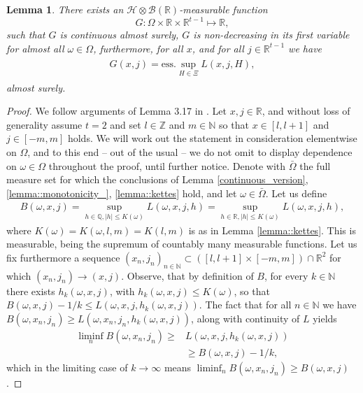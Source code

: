 \documentclass[a4paper]{article}
\newtheorem{lemma}[theorem]{Lemma}
\begin{document}
\begin{lemma}\label{lemma::pointwise_essup}
There exists an $\mathcal{H}\otimes\mathcal{B}(\mathbb{R})$-measurable function 
$$G :\Omega\times\mathbb{R}\times \mathbb{R}^{t-1} \mapsto \mathbb{R},$$ such that $G$ is 
continuous almost surely, $G$ is non-decreasing in its first variable for almost all 
$\omega\in\Omega$, furthermore, for all $x$, and for all $j \in \mathbb{R}^{t-1}$ we have 
\begin{align}\label{majus5}
\begin{split}
G(x, j) =  \mathrm{ess.}\sup_{H \in \Xi} L(x, j, H),
\end{split}
\end{align}
almost surely.
\end{lemma}

\begin{proof} We follow arguments of Lemma 3.17 in \cite{laurence}.
Let $x,j \in \mathbb{R}$, and without loss of generality assume $t = 2$ and set $l\in\mathbb{Z}$ 
and $m \in \mathbb{N}$ so that $x \in [l,l+1]$ and $j \in [-m,m]$ holds. We will 
work out the statement in consideration elementwise on $\Omega$, and to this end -- out of the usual -- we 
do not omit to display dependence on $\omega\in\Omega$ throughout the proof, until further notice. 
Denote with $\bar \Omega$ the full measure set for which the conclusions of Lemma \ref{continuous_version}, 
\ref{lemma::monotonicity_}, \ref{lemma::kettes} hold, and let $\omega \in \bar \Omega$. Let us define  
\begin{align*}
 B(\omega, x, j) = \sup_{h \in \mathbb{Q}, |h| \leq K(\omega)}L(\omega, x,j,h) = \sup_{h \in \mathbb{R}, |h| \leq K(\omega)}L(\omega, x,j,h),
\end{align*}
where $K(\omega) = K(\omega, l,m) = K(l,m)$ is as in Lemma \ref{lemma::kettes}. 
This is measurable, being the supremum of countably many measurable functions. Let us fix furthermore a sequence 
$(x_n,j_n)_{n \in \mathbb{N}} \subset ([l,l+1]\times[-m,m])\cap \mathbb{R}^2$ for which $(x_n,j_n) \to (x,j)$. 
Observe, that by definition of $B$, for every $k \in \mathbb{N}$ there exists $h_k(\omega, x,j)$, with 
$h_k(\omega, x,j) \leq K(\omega)$, so that $B(\omega, x,j) -1/k \leq L(\omega, x,j,h_k(\omega, x,j))$. 
The fact that for all $n\in\mathbb{N}$ we have $B(\omega,x_n,j_n) \geq L(\omega,x_n,j_n,h_k(\omega, x,j))$, along with continuity of $L$ yields
\begin{align*}
\liminf_{n}B(\omega,x_n,j_n) \geq & L(\omega,x,j,h_k(\omega, x,j)) 
\\
&
\geq
B(\omega, x,j) -1/k,
\end{align*}
which in the limiting case of $k \to \infty$ means $\liminf_{n}B(\omega,x_n,j_n) \geq B(\omega, x,j)$. 


\end{proof}
\end{document}
